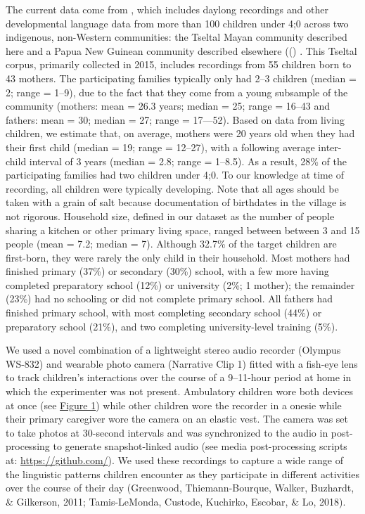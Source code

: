 \documentclass[floatsintext,man]{apa6}
\theoremstyle{definition}
\theoremstyle{definition}
\theoremstyle{definition}
\theoremstyle{remark}
\begin{document}
The current data come from , which includes daylong recordings and other
developmental language data from more than 100 children under 4;0 across
two indigenous, non-Western communities: the Tseltal Mayan community
described here and a Papua New Guinean community described elsewhere (()
. This Tseltal corpus, primarily collected in 2015, includes recordings
from 55 children born to 43 mothers. The participating families
typically only had 2--3 children (median = 2; range = 1--9), due to the
fact that they come from a young subsample of the community (mothers:
mean = 26.3 years; median = 25; range = 16--43 and fathers: mean = 30;
median = 27; range = 17---52). Based on data from living children, we
estimate that, on average, mothers were 20 years old when they had their
first child (median = 19; range = 12--27), with a following average
inter-child interval of 3 years (median = 2.8; range = 1--8.5). As a
result, 28\% of the participating families had two children under 4;0.
To our knowledge at time of recording, all children were typically
developing. Note that all ages should be taken with a grain of salt
because documentation of birthdates in the village is not rigorous.
Household size, defined in our dataset as the number of people sharing a
kitchen or other primary living space, ranged between between 3 and 15
people (mean = 7.2; median = 7). Although 32.7\% of the target children
are first-born, they were rarely the only child in their household. Most
mothers had finished primary (37\%) or secondary (30\%) school, with a
few more having completed preparatory school (12\%) or university (2\%;
1 mother); the remainder (23\%) had no schooling or did not complete
primary school. All fathers had finished primary school, with most
completing secondary school (44\%) or preparatory school (21\%), and two
completing university-level training (5\%).

We used a novel combination of a lightweight stereo audio recorder
(Olympus WS-832) and wearable photo camera (Narrative Clip 1) fitted
with a fish-eye lens to track children's interactions over the course of
a 9--11-hour period at home in which the experimenter was not present.
Ambulatory children wore both devices at once (see
\protect\hyperlink{fig1}{Figure 1}) while other children wore the
recorder in a onesie while their primary caregiver wore the camera on an
elastic vest. The camera was set to take photos at 30-second intervals
and was synchronized to the audio in post-processing to generate
snapshot-linked audio (see media post-processing scripts at:
\url{https://github.com/}). We used these recordings to capture a wide
range of the linguistic patterns children encounter as they participate
in different activities over the course of their day (Greenwood,
Thiemann-Bourque, Walker, Buzhardt, \& Gilkerson, 2011; Tamis-LeMonda,
Custode, Kuchirko, Escobar, \& Lo, 2018).
\end{document}
